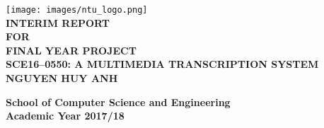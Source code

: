 \begin{titlepage}
\begin{center}

\texttt{[image: images/ntu\_logo.png]}
\\[4cm]

\uppercase{\textbf{Interim Report}\\
\textbf{for}\\
\textbf{Final Year Project}
\\[2cm]
\textbf{SCE16--0550: A Multimedia Transcription System}
\\[2cm]
\textbf{Nguyen Huy Anh}
}

\vfill

\textbf{School of Computer Science and Engineering}
\\
\textbf{Academic Year 2017/18}

\end{center}
\end{titlepage}

